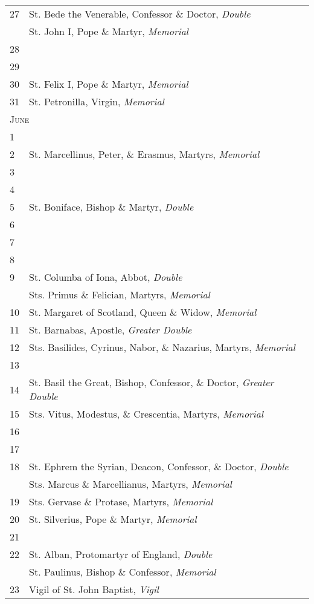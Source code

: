 \begin{longtable}{p{2mm}|p{94mm}}
27&St. Bede the Venerable, Confessor \& Doctor, \textit{Double}\\
&St. John I, Pope \& Martyr, \textit{Memorial}\\
28&\\
29&\\
30&St. Felix I, Pope \& Martyr, \textit{Memorial}\\
31&St. Petronilla, Virgin, \textit{Memorial}\\
\multicolumn{2}{l}{\textsc{June}}\\
1&\\
2&St. Marcellinus, Peter, \& Erasmus, Martyrs, \textit{Memorial}\\
3&\\
4&\\
5&St. Boniface, Bishop \& Martyr, \textit{Double}\\
6&\\
7&\\
8&\\
9&St. Columba of Iona, Abbot, \textit{Double}\\
&Sts. Primus \& Felician, Martyrs, \textit{Memorial}\\
10&St. Margaret of Scotland, Queen \& Widow, \textit{Memorial}\\
11&{\color{RubricRed}St. Barnabas, Apostle}, \textit{Greater Double}\\
12&Sts. Basilides, Cyrinus, Nabor, \& Nazarius, Martyrs, \textit{Memorial}\\
13&\\
14&St. Basil the Great, Bishop, Confessor, \& Doctor, \textit{Greater Double}\\
15&Sts. Vitus, Modestus, \& Crescentia, Martyrs, \textit{Memorial}\\
16&\\
17&\\
18&St. Ephrem the Syrian, Deacon, Confessor, \& Doctor, \textit{Double}\\
&Sts. Marcus \& Marcellianus, Martyrs, \textit{Memorial}\\
19&Sts. Gervase \& Protase, Martyrs, \textit{Memorial}\\
20&St. Silverius, Pope \& Martyr, \textit{Memorial}\\
21&\\
22&St. Alban, Protomartyr of England, \textit{Double}\\
&St. Paulinus, Bishop \& Confessor, \textit{Memorial}\\
23&Vigil of St. John Baptist, \textit{Vigil}\\

\end{longtable}
